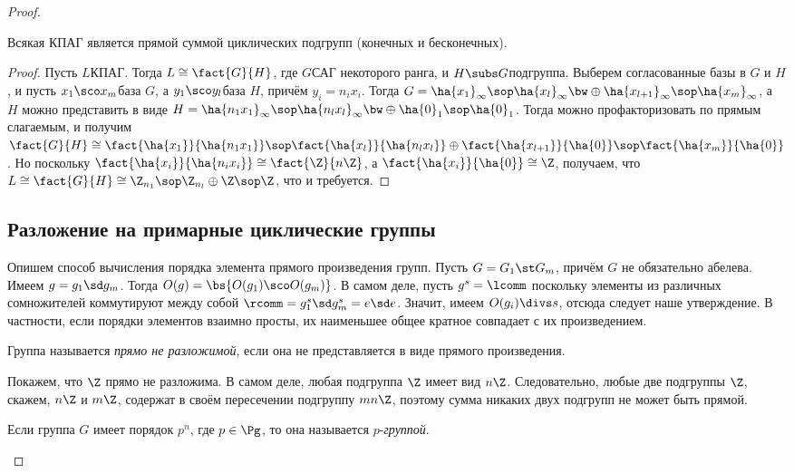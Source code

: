 \documentclass[a4paper]{article}
\begin{document}
\begin{proof}
\begin{imp}
Всякая КПАГ является прямой суммой циклических подгрупп (конечных и бесконечных).
\end{imp}
\begin{proof}
Пусть $L$\т КПАГ. Тогда $L \cong \fact{G}{H}$, где $G$\т САГ некоторого  ранга, и $H \subs G$\т подгруппа.
Выберем согласованные базы в $G$ и $H$, и пусть $x_1\sco x_m$\т база $G$, а $y_1\sco y_l$\т база $H$, причём
$y_i=n_ix_i$. Тогда $G=\ha{x_1}_\infty\sop \ha{x_l}_\infty\bw\oplus\ha{x_{l+1}}_\infty\sop \ha{x_m}_\infty$, а
$H$ можно представить в виде $H=\ha{n_1x_1}_\infty\sop \ha{n_lx_l}_\infty\bw\oplus\ha{0}_1\sop \ha{0}_1$. Тогда
можно профакторизовать по прямым слагаемым, и получим $\fact{G}{H} \cong \fact{\ha{x_1}}{\ha{n_1x_1}}\sop
\fact{\ha{x_l}}{\ha{n_lx_l}}\oplus \fact{\ha{x_{l+1}}}{\ha{0}}\sop\fact{\ha{x_m}}{\ha{0}}$. Но поскольку
$\fact{\ha{x_i}}{\ha{n_ix_i}} \cong \fact{\Z}{n\Z}$, а $\fact{\ha{x_i}}{\ha{0}} \cong \Z$, получаем, что $L
\cong \fact{G}{H} \cong \Z_{n_1}\sop\Z_{n_l}\oplus\Z\sop \Z$, что и требуется.
\end{proof}

\subsection{Разложение на примарные циклические группы}

Опишем способ вычисления порядка элемента прямого произведения групп.  Пусть $G=G_1\st G_m$, причём
$G$ не обязательно абелева. Имеем $g=g_1\sd g_m$. Тогда $O(g)=\bs{O(g_1)\sco O(g_m)}$. В самом деле, пусть
$g^s=\lcomm$ поскольку элементы из различных сомножителей коммутируют между собой $\rcomm = g_1^s\sd
g_m^s=e\sd e$. Значит, имеем $O(g_i) \divs s$, отсюда следует наше утверждение. В частности, если порядки
элементов взаимно просты, их наименьшее общее кратное совпадает с их произведением.

\begin{df}
Группа называется \emph{прямо не разложимой}, если она не представляется  в виде прямого произведения.
\end{df}

Покажем, что $\Z$ прямо не разложима. В самом деле, любая подгруппа $\Z$ имеет вид $n\Z$. Следовательно,
любые две подгруппы $\Z$, скажем, $n\Z$ и $m\Z$, содержат в своём пересечении подгруппу $mn\Z$, поэтому сумма
никаких двух подгрупп не может быть прямой.

\begin{df}
Если группа $G$ имеет порядок $p^n$, где $p \in \Pg$, то она называется $p$-\emph{группой}.
\end{df}


\end{proof}
\end{document}
